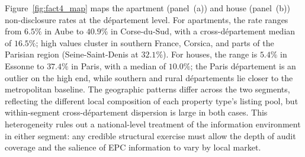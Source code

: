 Figure~\ref{fig:fact4_map} maps the apartment (panel~(a)) and house (panel~(b)) non-disclosure rates at the d\'epartement level. For apartments, the rate ranges from $6.5\%$ in Aube to $40.9\%$ in Corse-du-Sud, with a cross-d\'epartement median of $16.5\%$; high values cluster in southern France, Corsica, and parts of the Parisian region (Seine-Saint-Denis at $32.1\%$). For houses, the range is $5.4\%$ in Essonne to $37.4\%$ in Paris, with a median of $10.0\%$; the Paris d\'epartement is an outlier on the high end, while southern and rural d\'epartements lie closer to the metropolitan baseline. The geographic patterns differ across the two segments, reflecting the different local composition of each property type's listing pool, but within-segment cross-d\'epartement dispersion is large in both cases. This heterogeneity rules out a national-level treatment of the information environment in either segment: any credible structural exercise must allow the depth of audit coverage and the salience of EPC information to vary by local market.
